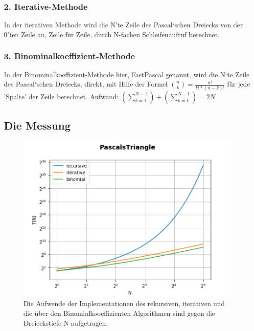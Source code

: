 \documentclass[
   draft=false
  ,paper=a4
  ,twoside=false
  ,fontsize=11pt
  ,headsepline
  ,DIV11
  ,parskip=full+
]{scrartcl} %
\begin{document}
\subsubsection*{2. Iterative-Methode}
In der iterativen Methode wird die N'te Zeile des Pascal`schen Dreiecks von der 0'ten Zeile an, Zeile für Zeile, durch N-fachen Schleifenaufruf berechnet.
$ $

\subsubsection*{3. Binominalkoeffizient-Methode}
In der Binominalkoeffizient-Methode hier, FastPascal genannt, wird die N`te Zeile des Pascal`schen Dreiecks, direkt, mit Hilfe der Formel 
$\binom{n}{k} = \frac{n!}{k!*(n-k)!}$ 
für jede 'Spalte' der Zeile berechnet.
Aufwand: $(\sum\nolimits_{k=1}^{N-1})+(\sum\nolimits_{k=1}^{N-1}) = 2N$


\flushleft
\subsection*{Die Messung}
	
\begin{figure}[htp]
	\label{fig:recuriterfast}
  	\centering
    \includegraphics[width=\textwidth]{./IMG/PascalsTriangle.png}
    \caption[recur iter fast]{Die Aufwende der Implementationen des rekursiven, iterativen und die über den Binomialkooeffizienten Algorithmen sind gegen die Dreieckstiefe N aufgetragen.}
\end{figure}
	
\end{document}
